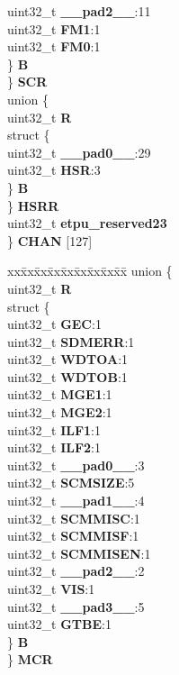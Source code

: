 \begin{DoxyCompactItemize}
\begin{tabbing}
\>\>\>uint32\_t {\bfseries \_\_pad2\_\_}:11\\
\>\>\>uint32\_t {\bfseries FM1}:1\\
\>\>\>uint32\_t {\bfseries FM0}:1\\
\>\>\} {\bfseries B}\\
\>\} {\bfseries SCR}\\
\>union \{\\
\>\>uint32\_t {\bfseries R}\\
\>\>struct \{\\
\>\>\>uint32\_t {\bfseries \_\_pad0\_\_}:29\\
\>\>\>uint32\_t {\bfseries HSR}:3\\
\>\>\} {\bfseries B}\\
\>\} {\bfseries HSRR}\\
\>uint32\_t {\bfseries etpu\_reserved23}\\
\} {\bfseries CHAN} \mbox{[}127\mbox{]}\\

\end{tabbing}\item 
\mbox{\label{structETPU__tag_a7a09db54150611459842d2914809fa2f}} 
\begin{tabbing}
xx\=xx\=xx\=xx\=xx\=xx\=xx\=xx\=xx\=\kill
union \{\\
\>uint32\_t {\bfseries R}\\
\>struct \{\\
\>\>uint32\_t {\bfseries GEC}:1\\
\>\>uint32\_t {\bfseries SDMERR}:1\\
\>\>uint32\_t {\bfseries WDTOA}:1\\
\>\>uint32\_t {\bfseries WDTOB}:1\\
\>\>uint32\_t {\bfseries MGE1}:1\\
\>\>uint32\_t {\bfseries MGE2}:1\\
\>\>uint32\_t {\bfseries ILF1}:1\\
\>\>uint32\_t {\bfseries ILF2}:1\\
\>\>uint32\_t {\bfseries \_\_pad0\_\_}:3\\
\>\>uint32\_t {\bfseries SCMSIZE}:5\\
\>\>uint32\_t {\bfseries \_\_pad1\_\_}:4\\
\>\>uint32\_t {\bfseries SCMMISC}:1\\
\>\>uint32\_t {\bfseries SCMMISF}:1\\
\>\>uint32\_t {\bfseries SCMMISEN}:1\\
\>\>uint32\_t {\bfseries \_\_pad2\_\_}:2\\
\>\>uint32\_t {\bfseries VIS}:1\\
\>\>uint32\_t {\bfseries \_\_pad3\_\_}:5\\
\>\>uint32\_t {\bfseries GTBE}:1\\
\>\} {\bfseries B}\\
\} {\bfseries MCR}\\


\end{tabbing}
\end{DoxyCompactItemize}
